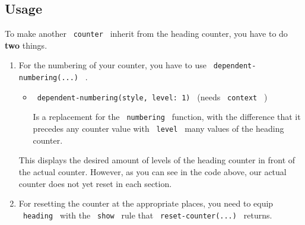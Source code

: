 
\subsection{Usage}\label{usage}

To make another \texttt{\ counter\ } inherit from the heading counter,
you have to do \textbf{two} things.

\begin{enumerate}
\item
  For the numbering of your counter, you have to use
  \texttt{\ dependent-numbering(...)\ } .

  \begin{itemize}
  \item
    \texttt{\ dependent-numbering(style,\ level:\ 1)\ } (needs
    \texttt{\ context\ } )

    Is a replacement for the \texttt{\ numbering\ } function, with the
    difference that it precedes any counter value with
    \texttt{\ level\ } many values of the heading counter.
  \end{itemize}

\begin{Shaded}
\begin{Highlighting}[]







\end{Highlighting}
\end{Shaded}

  This displays the desired amount of levels of the heading counter in
  front of the actual counter. However, as you can see in the code
  above, our actual counter does not yet reset in each section.
\item
  For resetting the counter at the appropriate places, you need to equip
  \texttt{\ heading\ } with the \texttt{\ show\ } rule that
  \texttt{\ reset-counter(...)\ } returns.


\end{enumerate}
